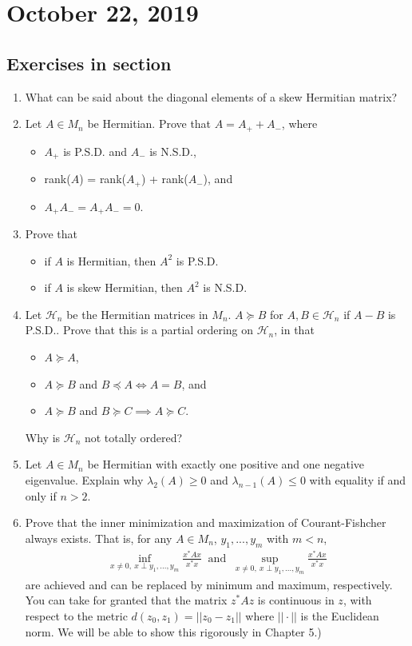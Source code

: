 \documentclass[11pt]{article}
\theoremstyle{plain}
\theoremstyle{definition}
\theoremstyle{remark}
\begin{document}
\section{October 22, 2019}

\subsection*{Exercises in section}

\begin{enumerate}
    \item What can be said about the diagonal elements of a skew Hermitian matrix?
    \item Let $A \in M_n$ be Hermitian. Prove that $A = A_+ + A_-$, where
    \begin{itemize}
        \item $A_+$ is P.S.D. and $A_-$ is N.S.D.,
        \item rank($A$) = rank($A_+$) + rank($A_-$), and 
        \item $A_+ A_- = A_+ A_- = 0$.
    \end{itemize}
    \item Prove that
    \begin{itemize}
        \item if $A$ is Hermitian, then $A^2$ is P.S.D.
        \item if $A$ is skew Hermitian, then $A^2$ is N.S.D.
    \end{itemize}
    \item Let $\mathcal{H}_n$ be the Hermitian matrices in $M_n$. $A \succeq B$ for $A, B \in \mathcal{H}_n$ if $A - B$ is P.S.D.. Prove that this is a partial ordering on $\mathcal{H}_n$, in that
    \begin{itemize}
        \item $A \succeq A$,
        \item $A \succeq B$ and $B \preceq A \iff A = B$, and
        \item $A \succeq B$ and $B \succeq C \implies A \succeq C$.
    \end{itemize}
    Why is $\mathcal{H}_n$ not totally ordered?
    \item Let $A \in M_n$ be Hermitian with exactly one positive and one negative eigenvalue. Explain why $\lambda_2(A) \geq 0$ and $\lambda_{n-1}(A) \leq 0$ with equality if and only if $n > 2$.
    \item Prove that the inner minimization and maximization of Courant-Fishcher always exists. That is, for any $A \in M_n$, $y_{1}, ..., y_{m}$ with $m < n$,
    \begin{align*}
        \inf_{x \neq 0, \ x \perp y_{1}, ..., y_{m}} \frac{x^* A x}{x^*x} \ \text{ and } \ \sup_{x \neq 0, \ x \perp y_{1}, ..., y_{m}} \frac{x^* A x}{x^*x}
    \end{align*}
    are achieved and can be replaced by minimum and maximum, respectively. You can take for granted that the matrix $z^* A z$ is continuous in $z$, with respect to the metric $d(z_0, z_1) = ||z_0 - z_1||$ where $||\cdot||$ is the Euclidean norm. We will be able to show this rigorously in Chapter 5.)
\end{enumerate}
\end{document}
